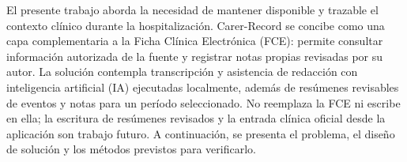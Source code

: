 El presente trabajo aborda la necesidad de mantener disponible y trazable el contexto clínico durante la hospitalización. Carer-Record se concibe como una capa complementaria a la Ficha Clínica Electrónica (FCE): permite consultar información autorizada de la fuente y registrar notas propias revisadas por su autor. La solución contempla transcripción y asistencia de redacción con inteligencia artificial (IA) ejecutadas localmente, además de resúmenes revisables de eventos y notas para un período seleccionado. No reemplaza la FCE ni escribe en ella; la escritura de resúmenes revisados y la entrada clínica oficial desde la aplicación son trabajo futuro. A continuación, se presenta el problema, el diseño de solución y los métodos previstos para verificarlo.
